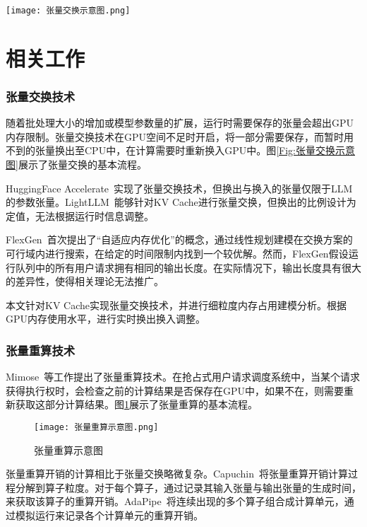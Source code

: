 \begin{figure*}[!htbp]
    \centering
    \texttt{[image: 张量交换示意图.png]}
    \caption{张量交换示意图} 
    \label{Fig:张量交换示意图}
  \end{figure*}

\section{相关工作}

\subsubsection{张量交换技术}

随着批处理大小的增加或模型参数量的扩展，运行时需要保存的张量会超出GPU内存限制。张量交换技术在GPU空间不足时开启，将一部分需要保存，而暂时用不到的张量换出至CPU中，在计算需要时重新换入GPU中。图\ref{Fig:张量交换示意图}展示了张量交换的基本流程。

HuggingFace Accelerate~\cite{Huggingface-Accelerate}实现了张量交换技术，但换出与换入的张量仅限于LLM的参数张量。LightLLM~\cite{LightLLM}能够针对KV Cache进行张量交换，但换出的比例设计为定值，无法根据运行时信息调整。

FlexGen~\cite{Swapping}首次提出了“自适应内存优化”的概念，通过线性规划建模在交换方案的可行域内进行搜索，在给定的时间限制内找到一个较优解。然而，FlexGen假设运行队列中的所有用户请求拥有相同的输出长度。在实际情况下，输出长度具有很大的差异性，使得相关理论无法推广。

本文针对KV Cache实现张量交换技术，并进行细粒度内存占用建模分析。根据GPU内存使用水平，进行实时换出换入调整。

\subsubsection{张量重算技术}

Mimose~\cite{Recomputation, Recomp_2, Recomp_3}等工作提出了张量重算技术。在抢占式用户请求调度系统中，当某个请求获得执行权时，会检查之前的计算结果是否保存在GPU中，如果不在，则需要重新获取这部分计算结果。图\ref{Fig:张量重算示意图}展示了张量重算的基本流程。

\begin{figure}[!htbp]
  \centering
  \texttt{[image: 张量重算示意图.png]}
  \caption{张量重算示意图} 
  \label{Fig:张量重算示意图}
\end{figure}

张量重算开销的计算相比于张量交换略微复杂。Capuchin~\cite{Capuchin}将张量重算开销计算过程分解到算子粒度。对于每个算子，通过记录其输入张量与输出张量的生成时间，来获取该算子的重算开销。AdaPipe~\cite{AdaPipe}将连续出现的多个算子组合成计算单元，通过模拟运行来记录各个计算单元的重算开销。


